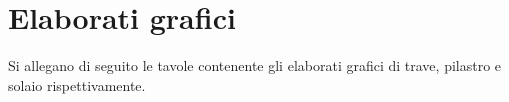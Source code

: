 \documentclass[a4paper, oneside, openright, 
]{report}
\newcommand{\contentinput}[1]{}
\begin{document}
\contentinput{title}
\contentinput{toc}
\contentinput{01_intro}
\contentinput{02_piante}
\contentinput{03_norme}
\contentinput{04_materiali}
\contentinput{05_traveFlessioneSLU}
\contentinput{06_traveTaglioSLU}
\contentinput{07_traveSLE}
\contentinput{08_pilastro}
\contentinput{09_solaio}
\cleardoublepage
\nocite{law:ntc2018, law:circ2019, law:ec2, book:cosenza}
\printbibliography
\chapter{Elaborati grafici}
Si allegano di seguito le tavole contenente gli elaborati grafici di trave, pilastro e solaio rispettivamente.
\end{document}
